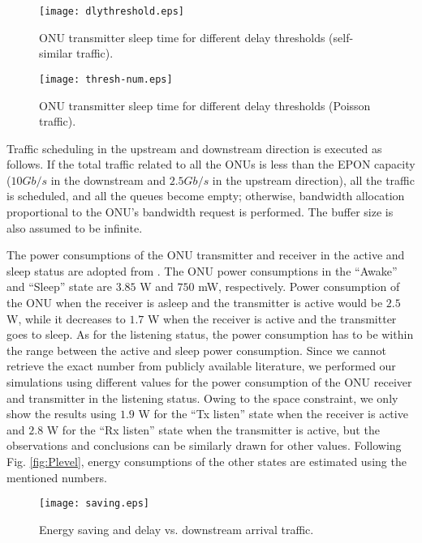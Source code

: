 \documentclass[11pt,english,12pt,onecolumn, draftcls]{IEEEtran}
\theoremstyle{plain}
\theoremstyle{definition}
\begin{document}
\begin{figure}
\centering
\texttt{[image: dlythreshold.eps]}
\caption{ONU transmitter sleep time for different delay thresholds (self-similar traffic).}
\label{fig:thresh}
\vspace{-.15in}
\end{figure}

\begin{figure}
\centering
\texttt{[image: thresh-num.eps]}
\caption{ONU transmitter sleep time for different delay thresholds (Poisson traffic).}
\label{fig:threshn}
\vspace{-.15in}
\end{figure}


Traffic scheduling in the upstream and downstream direction is executed as follows. If the total traffic related to all the ONUs is less than the EPON capacity ($10 Gb/s$ in the downstream and $2.5 Gb/s$ in the upstream direction), all the traffic is scheduled, and all the queues become empty; otherwise, bandwidth allocation proportional to the ONU's bandwidth request is performed. The buffer size is also assumed to be infinite.


The power consumptions of the ONU transmitter and receiver in the active and sleep status are adopted from \cite{series2000transmission}. The ONU power consumptions in the ``Awake'' and ``Sleep'' state are $3.85$ W and $750$ mW, respectively. Power consumption of the ONU when the receiver is asleep and the transmitter is active would be $2.5$ W, while it decreases to $1.7$ W when the receiver is active and the transmitter goes to sleep. As for the listening status, the power consumption has to be within the range between the active and sleep power consumption. Since we cannot retrieve the exact number from publicly available literature, we performed our simulations using different values for the power consumption of the ONU receiver and transmitter in the listening status. Owing to the space constraint, we only show the results using $1.9$ W for the ``Tx listen'' state when the receiver is active and $2.8$ W for the ``Rx listen'' state when the transmitter is active, but the observations and conclusions can be similarly drawn for other values. Following Fig. \ref{fig:Plevel}, energy consumptions of the other states are estimated using the mentioned numbers.

\begin{figure}
\centering
\texttt{[image: saving.eps]}
\caption{Energy saving and delay vs. downstream arrival traffic.}
\label{fig:save}
\vspace{-.2in}
\end{figure}
\end{document}
